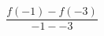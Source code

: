 \documentclass[preview]{standalone}
\begin{document}
\begin{align*}
\dfrac{f(-1) - f(-3)}{-1 - -3}
\end{align*}
\end{document}
